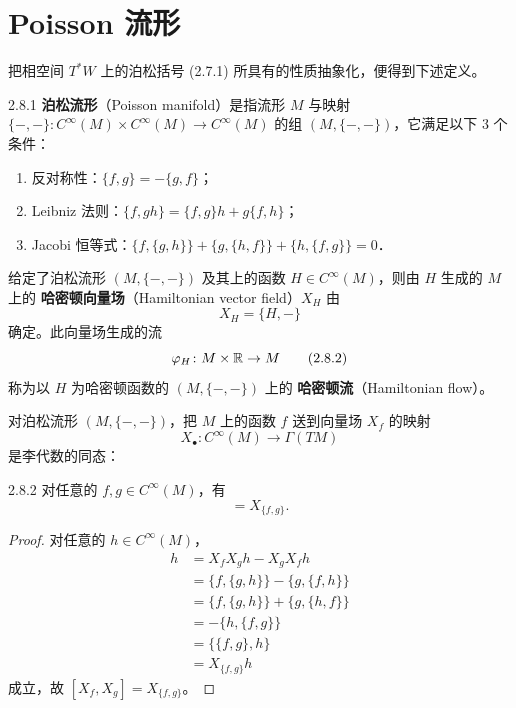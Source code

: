 
\section{Poisson 流形}

把相空间 $T^*W$ 上的泊松括号 (2.7.1) 所具有的性质抽象化，便得到下述定义。

\begin{definition}{2.8.1}
\textbf{泊松流形}（Poisson manifold）是指流形 $M$ 与映射 $\{-,-\}\colon C^\infty(M)\times C^\infty(M)\to C^\infty(M)$ 的组 $(M,\{-,-\})$，它满足以下 3 个条件：
\begin{enumerate}[label=\arabic*.,leftmargin=2em]
  \item 反对称性：$\{f,g\} = -\{g,f\}$；
  \item Leibniz 法则：$\{f,gh\} = \{f,g\}h+g\{f,h\}$；
  \item Jacobi 恒等式：$\{f,\{g,h\}\}+\{g,\{h,f\}\}+\{h,\{f,g\}\} = 0$．
\end{enumerate}
\end{definition}

给定了泊松流形 $(M,\{-,-\})$ 及其上的函数 $H\in C^\infty(M)$，则由 $H$ 生成的 $M$ 上的 \textbf{哈密顿向量场}（Hamiltonian vector field）$X_H$ 由
\begin{equation}
  X_H = \{H,-\}
  \tag{2.8.1}
\end{equation}
确定。此向量场生成的流
\begin{equation}
  \varphi_H\colon M\times\mathbb{R}\to M
  \tag{2.8.2}
\end{equation}
称为以 $H$ 为哈密顿函数的 $(M,\{-,-\})$ 上的 \textbf{哈密顿流}（Hamiltonian flow）。

对泊松流形 $(M,\{-,-\})$，把 $M$ 上的函数 $f$ 送到向量场 $X_f$ 的映射
\begin{equation}
  X_{\bullet}\colon C^\infty(M)\to\Gamma(TM)
  \tag{2.8.3}
\end{equation}
是李代数的同态：

\begin{proposition*}{2.8.2}
对任意的 $f,g\in C^\infty(M)$，有
\begin{equation}
  [X_f,X_g] = X_{\{f,g\}}.
  \tag{2.8.4}
\end{equation}
\end{proposition*}

\begin{proof}
对任意的 $h\in C^\infty(M)$，
\begin{align}
  [X_f,X_g]h &= X_fX_gh-X_gX_fh
  \tag{2.8.5}\\
  &= \{f,\{g,h\}\}-\{g,\{f,h\}\}
  \tag{2.8.6}\\
  &= \{f,\{g,h\}\}+\{g,\{h,f\}\}
  \tag{2.8.7}\\
  &= -\{h,\{f,g\}\}
  \tag{2.8.8}\\
  &= \{\{f,g\},h\}
  \tag{2.8.9}\\
  &= X_{\{f,g\}}h
  \tag{2.8.10}
\end{align}
成立，故 $[X_f,X_g] = X_{\{f,g\}}$。
\end{proof}

